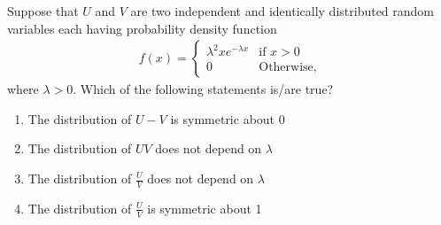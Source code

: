 \documentclass[journal,12pt,twocolumn]{IEEEtran}
\theoremstyle{remark}
\begin{document}



\maketitle

\newpage


\bigskip

\renewcommand{\thefigure}{\theenumi}
\renewcommand{\thetable}{\theenumi}

%


Suppose that $U$ and $V$ are two independent and identically distributed random
variables each having probability density function
\begin{align}
f(x) = 
\begin{cases}
\lambda^{2}xe^{-\lambda x} & \text{if } x > 0\\
0 & \text{Otherwise,}
\end{cases} 
\end{align}
where $\lambda > 0$. Which of the following statements is/are true?
\begin{enumerate}
\item The distribution of $U-V$ is symmetric about 0
\item The distribution of $UV$ does not depend on $\lambda$
\item The distribution of $\frac{U}{V}$ does not depend on $\lambda$
\item The distribution of $\frac{U}{V}$ is symmetric about 1
\end{enumerate}
\end{document}
